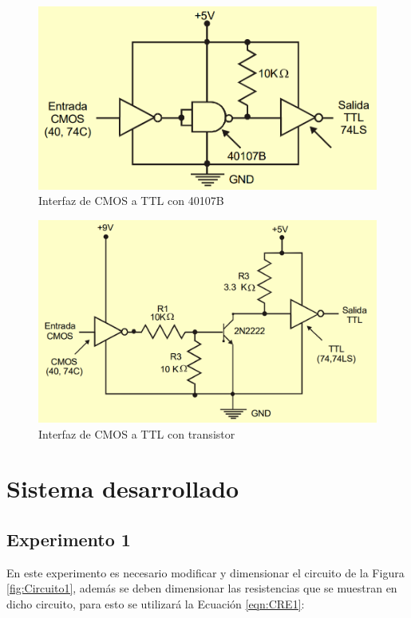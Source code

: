 \documentclass[journal]{IEEEtran}
\begin{document}
	\begin{figure}[!htb]
		\centering
		\includegraphics[scale = 0.25]{img/CMOSTTL40.png}
		\caption{Interfaz de CMOS a TTL con 40107B \cite{Ladelex}}
		\label{fig:CMOSTTL40}
	\end{figure}
	
	\begin{figure}[!htb]
		\centering
		\includegraphics[scale = 0.2]{img/CMOSTTLTrans.png}
		\caption{Interfaz de CMOS a TTL con transistor \cite{Ladelex}}
		\label{fig:CMOSTTLTrans}
	\end{figure}
	
	\section{Sistema desarrollado}
	
	\subsection{Experimento 1}
	En este experimento es necesario modificar y dimensionar el circuito de la Figura \ref{fig:Circuito1}, además se deben dimensionar las resistencias que se muestran en dicho circuito, para esto se utilizará la Ecuación \ref{eqn:CRE1}:
	
\end{document}
